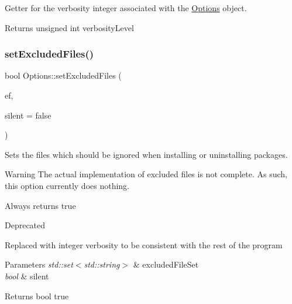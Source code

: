 Getter for the verbosity integer associated with the \mbox{\hyperlink{classOptions}{Options}} object. 

\begin{DoxyReturn}{Returns}
unsigned int verbosity\+Level 
\end{DoxyReturn}
\mbox{\label{classOptions_a6a3e6714e36c0b92acc6bb26e8d0a340}} 
\subsubsection{\texorpdfstring{setExcludedFiles()}{setExcludedFiles()}\hspace{0.1cm}{\footnotesize\ttfamily [1/2]}}
{\footnotesize\ttfamily bool Options\+::set\+Excluded\+Files (\begin{DoxyParamCaption}\item[{std\+::set$<$ std\+::string $>$}]{ef,  }\item[{bool}]{silent = {\ttfamily false} }\end{DoxyParamCaption})}



Sets the files which should be ignored when installing or uninstalling packages. 

\begin{DoxyWarning}{Warning}
The actual implementation of excluded files is not complete. As such, this option currently does nothing.
\end{DoxyWarning}
Always returns true

\begin{DoxyRefDesc}{Deprecated}
\item[\mbox{\hyperlink{deprecated__deprecated000014}{Deprecated}}]Replaced with integer verbosity to be consistent with the rest of the program\end{DoxyRefDesc}



\begin{DoxyParams}{Parameters}
{\em std\+::set$<$std\+::string$>$} & excluded\+File\+Set \\
\hline
{\em bool} & silent\\
\hline
\end{DoxyParams}
\begin{DoxyReturn}{Returns}
bool true 
\end{DoxyReturn}
\mbox{\label{classOptions_ae98c81f1bbace97cdf753c93dddac9c6}} 
